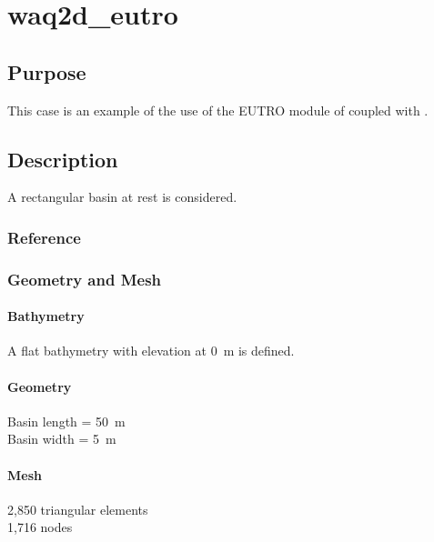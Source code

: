 \chapter{waq2d\_eutro}
%
%
\section{Purpose}
%
This case is an example of the use of the EUTRO module of \waqtel coupled with .
%
\section{Description}
%
A rectangular basin at rest is considered.
%
%
%
%
\subsection{Reference}
%

%
%
%
\subsection{Geometry and Mesh}
%
\subsubsection{Bathymetry}
%
A flat bathymetry with elevation at 0~m is defined.
%
\subsubsection{Geometry}
%
Basin length = 50~m\\
Basin width = 5~m
%
\subsubsection{Mesh}
%
2,850 triangular elements\\
1,716 nodes
%
%
%
